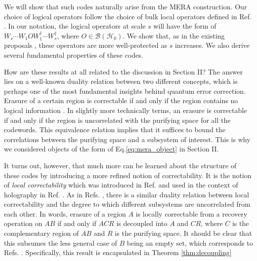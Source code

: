 \documentclass[a4paper,11pt]{article}
\newcommand{\1}{\mathbbm{1}}
\begin{document}
We will show that such codes naturally arise from the MERA construction. Our choice of logical operators follow the choice of bulk local operators defined in Ref. \cite{Qi2013,Miyaji2015}. In
our notation, the logical operators at scale $s$ will have the form of $W_s\cdots W_1 O W_1^{\dagger}\cdots W_s^{\dagger}$, where $O\in \mathcal{B}(\mathcal{H}_0)$. We show that, as in
the existing proposals \cite{Pastawski2015,Yang2015,Hayden2016,Donnelly2016}, these operators are more well-protected as $s$ increases. We also derive several fundamental properties of these codes.

How are these results at all related to the discussion in Section II? The answer lies on a well-known duality relation between two different concepts, which is perhaps one of the most
fundamental insights behind quantum error correction.  Erasure of a certain region is correctable if and
only if the region contains no logical information \cite{Kretschmann2008,Beny2010}. In slightly more technically terms, an erasure is correctable if and only if the region is uncorrelated
with the purifying space for all the codewords. This equivalence relation implies that it suffices to bound the correlations between the purifying space and a subsystem of interest. This is why
we considered objects of the form of Eq.\ref{eq:mera_object} in Section II.

It turns out, however, that much more can be learned about the structure of these codes by introducing a more refined notion of correctability. It is the notion of \emph{local correctability}
which was introduced in Ref. \cite{Flammia2016} and used in the context of holography in Ref. \cite{Pastawski2016a}. As in Refs. \cite{Kretschmann2008,Beny2010}, there is a similar duality relation between local correctability and the degree to which different subsystems are uncorrelated from each other. In words, erasure of a region $A$
is locally correctable from a recovery operation on $AB$ if and only if $ACR$ is decoupled into $A$ and $CR$, where $C$ is the complementary region of $AB$ and $R$ is the purifying space.
It should be clear that this subsumes the less general case of $B$ being an empty set, which corresponds to Refs. \cite{Kretschmann2008,Beny2010}. Specifically, this result is encapsulated in
Theorem \ref{thm:decoupling}
\end{document}
